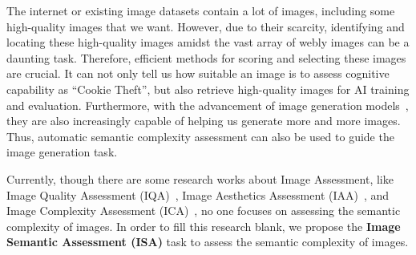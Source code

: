 The internet or existing image datasets contain a lot of images, including some high-quality images that we want. 
However, due to their scarcity, identifying and locating these high-quality images amidst the vast array of webly images can be a daunting task. 
Therefore, efficient methods for scoring and selecting these images are crucial.
It can not only tell us how suitable an image is to assess cognitive capability as ``Cookie Theft'', but also retrieve high-quality images for AI training and evaluation.
Furthermore, with the advancement of image generation models~\cite{Rombach2021HighResolutionIS, pmlr-v139-ramesh21a, Ramesh2022HierarchicalTI}, they are also increasingly capable of helping us generate more and more images.
Thus, automatic semantic complexity assessment can also be used to guide the image generation task. 

Currently, though there are some research works about Image Assessment, like Image Quality Assessment (IQA)~\cite{Fang_2020_CVPR, ying2020patches}, Image Aesthetics Assessment (IAA)~\cite{ijcai2022p132, Yi_2023_CVPR}, and Image Complexity Assessment (ICA)~\cite{saraee2020visual, ic9600}, no one focuses on assessing the semantic complexity of images.
In order to fill this research blank, we propose the \textbf{Image Semantic Assessment (ISA)} task to assess the semantic complexity of images.

